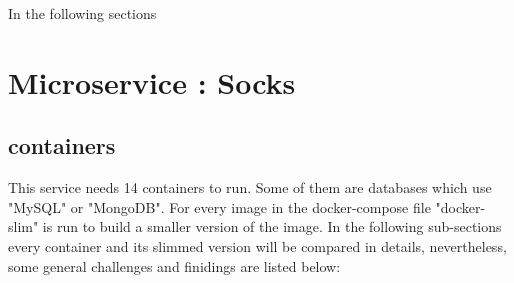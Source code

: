 
In the following sections 

\section {Microservice : Socks}
\subsection{containers}
This service needs 14 containers to run. Some of them are databases which use "MySQL" or "MongoDB". For every image in the docker-compose file "docker-slim" is run to build a smaller version of the image. In the following sub-sections every container and its slimmed version will be compared in details, nevertheless, some general challenges and finidings are listed below:

